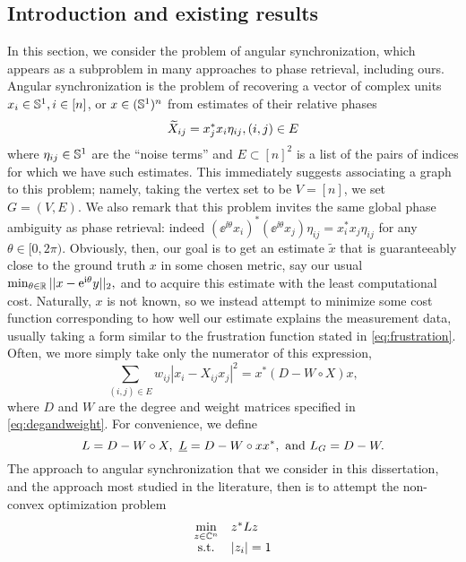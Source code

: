 \label{sec:ang_sync}
\subsection{Introduction and existing results}
In this section, we consider the problem of angular synchronization, which appears as a subproblem in many approaches to phase retrieval, including ours.  Angular synchronization is the problem of recovering a vector of complex units $x_i \in \mathbb{S}^1, i \in [n]$, or $x \in (\mathbb{S}^1)^n$ from estimates of their relative phases \[\widetilde{X}_{ij} = x_j^* x_i \eta_{ij}, (i, j) \in E\] where $\eta_{ij} \in \mathbb{S}^1$ are the ``noise terms'' and $E \subset [n]^2$ is a list of the pairs of indices for which we have such estimates.  This immediately suggests associating a graph to this problem; namely, taking the vertex set to be $V = [n]$, we set $G = (V, E)$.  We also remark that this problem invites the same global phase ambiguity as phase retrieval: indeed $(\ee^{\ii \theta} x_i)^* (\ee^{\ii \theta} x_j) \eta_{ij} = x_i^* x_j \eta_{ij}$ for any $\theta \in [0, 2\pi)$.  Obviously, then, our goal is to get an estimate $\tilde{x}$ that is guaranteeably close to the ground truth $x$ in some chosen metric, say our usual $\min_{\theta \in \mathbb{R}} || x - \mathrm{e}^{\mathrm{i} \theta} y ||_2,$ and to acquire this estimate with the least computational cost.  Naturally, $x$ is not known, so we instead attempt to minimize some cost function corresponding to how well our estimate explains the measurement data, usually taking a form similar to the frustration function stated in \eqref{eq:frustration}.  Often, we more simply take only the numerator of this expression, \[\sum_{(i, j) \in E} w_{ij} |x_i - X_{ij} x_j|^2 = x^* (D - W \circ X) x, \label{eq:ang_sync_cost}\] where $D$ and $W$ are the degree and weight matrices specified in \eqref{eq:degandweight}.  For convenience, we define \begin{equation} L = D - W \circ X, \ \underline{L} = D - W \circ x x^*, \ \text{and} \ L_G = D - W. \label{eq:L_defs} \end{equation}  The approach to angular synchronization that we consider in this dissertation, and the approach most studied in the literature, then is to attempt the non-convex optimization problem \begin{equation} \begin{array}{cl} \min\limits_{z \in \mathbb{C}^n} & z^* L z \\ \text{s.t.} & |z_i| = 1 \end{array} \label{eq:ang_sync}\end{equation}

